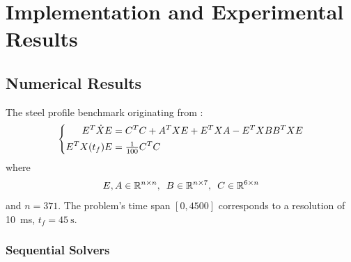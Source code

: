 \chapter{Implementation and Experimental Results}
\label{sec:results}




\section{Numerical Results}


\begin{example}
The steel profile benchmark \cite{morwiki_steel} originating from \cite{Benner2005}:
\label{thm:results:rail}
\begin{equation}
\left\{
\begin{aligned}
  E^T \dot X E &= C^T C + A^T X E + E^T X A - E^T X BB^T X E \\
  E^T X(t_f) E &= \tfrac{1}{100} C^T C
\end{aligned}
\right.
\end{equation}
where
\begin{equation}
  E, A \in \mathbb{R}^{n\times n},
  \enspace
  B \in \mathbb{R}^{n \times 7},
  \enspace
  C \in \mathbb{R}^{6 \times n}
\end{equation}
and $n=371$.
The problem's time span $[0,4500]$ corresponds to a resolution of \SI{10}{\milli\second},
\ie $t_f = \SI{45}{\second}$.
\end{example}

\subsection{Sequential Solvers}

